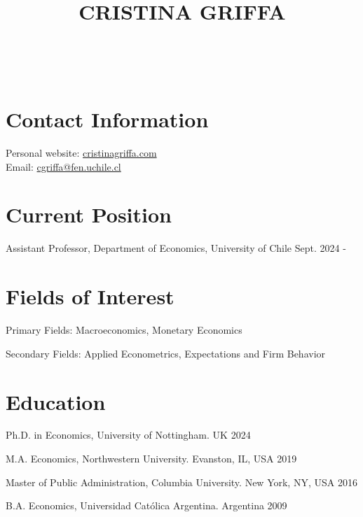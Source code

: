 \documentclass[11pt,letterpaper]{article}%
\title{\vspace{-5ex} \textbf{CRISTINA GRIFFA \vspace{-8.8ex}}}
\date{}
\newcommand{\makeheading}[2][]%
{\hspace*{\marginparsep minus \marginparwidth}%
	\begin{minipage}[t]{\textwidth\marginparwidth\marginparsep}%
		{\large \bfseries #2 \hfill #1}\\[-0.15\baselineskip]%
\end{minipage}}
\begin{document}
\maketitle
\makeheading{}

\section*{Contact Information}
\vspace{-0.2cm}
\begin{minipage}[t]{.65\linewidth}
{\small
Personal website: \href{https://cristinagriffa.com}{cristinagriffa.com} \\ 
Email: \href{mailto:cgriffa@fen.uchile.cl}{cgriffa@fen.uchile.cl} \\
}
\end{minipage}


\section*{Current Position}
\vspace{-0.2cm}
\begin{list}{}{} 
\itemindent=-15pt
\item Assistant Professor, Department of Economics, University of Chile \hfill {Sept. 2024 -}
\end{list}

\section*{Fields of Interest}
\vspace{-0.2cm}
\begin{list}{}{} 
\itemindent=-15pt
\setlength\itemsep{-0.1cm}
\item Primary Fields: Macroeconomics, Monetary Economics
\item Secondary Fields: Applied Econometrics, Expectations and Firm Behavior
\end{list}

\section*{Education}
\vspace{-0.2cm}
\begin{list}{}{} 
\setlength\itemsep{-0.1cm}
\itemindent=-15pt
\item Ph.D. in Economics, University of Nottingham. UK \hfill {2024} 
\item M.A. Economics, Northwestern University. Evanston, IL, USA \hfill 2019
\item Master of Public Administration, Columbia University. New York, NY, USA \hfill 2016
\item B.A. Economics, Universidad Católica Argentina. Argentina \hfill 2009
\end{list}
\end{document}
